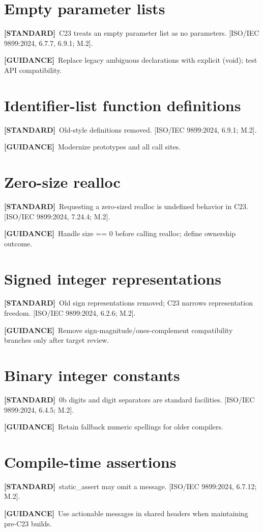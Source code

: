 \documentclass[10pt,letterpaper,oneside]{report}
\newcommand{\refcl}[1]{\textsf{\footnotesize[ISO/IEC 9899:2024, #1]}}
\newcommand{\standard}{\textbf{[STANDARD]}}
\newcommand{\guidance}{\textbf{[GUIDANCE]}}
\begin{document}
\section{Empty parameter lists}
\standard\ C23 treats an empty parameter list as no parameters. \refcl{6.7.7, 6.9.1; M.2}.\par\guidance\ Replace legacy ambiguous declarations with explicit (void); test API compatibility.

\section{Identifier-list function definitions}
\standard\ Old-style definitions removed. \refcl{6.9.1; M.2}.\par\guidance\ Modernize prototypes and all call sites.

\section{Zero-size realloc}
\standard\ Requesting a zero-sized realloc is undefined behavior in C23. \refcl{7.24.4; M.2}.\par\guidance\ Handle size == 0 before calling realloc; define ownership outcome.

\section{Signed integer representations}
\standard\ Old sign representations removed; C23 narrows representation freedom. \refcl{6.2.6; M.2}.\par\guidance\ Remove sign-magnitude/ones-complement compatibility branches only after target review.

\section{Binary integer constants}
\standard\ 0b digits and digit separators are standard facilities. \refcl{6.4.5; M.2}.\par\guidance\ Retain fallback numeric spellings for older compilers.

\section{Compile-time assertions}
\standard\ static\_assert may omit a message. \refcl{6.7.12; M.2}.\par\guidance\ Use actionable messages in shared headers when maintaining pre-C23 builds.
\end{document}
